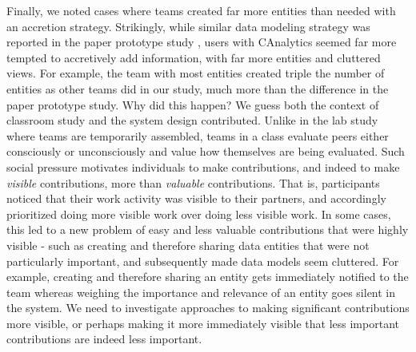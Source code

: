 Finally, we noted cases where teams created far more entities than needed with an
accretion strategy. Strikingly, while similar data modeling strategy was
reported in the paper prototype study \citep{Carroll2013}, users with CAnalytics
seemed far more tempted to accretively add information, with far more entities
and cluttered views. For example, the team with most entities created triple the number of entities as 
other teams did in our study, much more than the difference
in the paper prototype study. Why did this happen? We guess both the context of
classroom study and the system design contributed. Unlike in the lab study where
teams are temporarily assembled, teams in a class evaluate peers either
consciously or unconsciously and value how themselves are being evaluated. Such
social pressure motivates individuals to make contributions, and indeed to make
\emph{visible} contributions, more than \emph{valuable} contributions. That is,
participants noticed that their work activity was visible to their partners, and
accordingly prioritized doing more visible work over doing less visible work. In
some cases, this led to a new problem of easy and less valuable contributions
that were highly visible - such as creating and therefore sharing data entities
that were not particularly important, and subsequently made data models seem
cluttered. For example, creating and therefore sharing an entity gets
immediately notified to the team whereas weighing the importance and relevance
of an entity goes silent in the system. We need to investigate approaches to
making significant contributions more visible, or perhaps making it more
immediately visible that less important contributions are indeed less important.